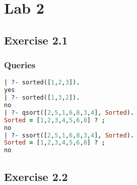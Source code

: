 \section{Lab 2}
\subsection{Exercise 2.1}

\pagebreak
\subsubsection{Queries}
\begin{lstlisting}[language=Prolog]
| ?- sorted([1,2,3]).
yes
| ?- sorted([1,3,2]).
no
| ?- qsort([2,5,1,6,8,3,4], Sorted).
Sorted = [1,2,3,4,5,6,8] ? ;
no
| ?- ssort([2,5,1,6,8,3,4], Sorted).
Sorted = [1,2,3,4,5,6,8] ? ;
no
\end{lstlisting}
\subsection{Exercise 2.2}

\pagebreak
